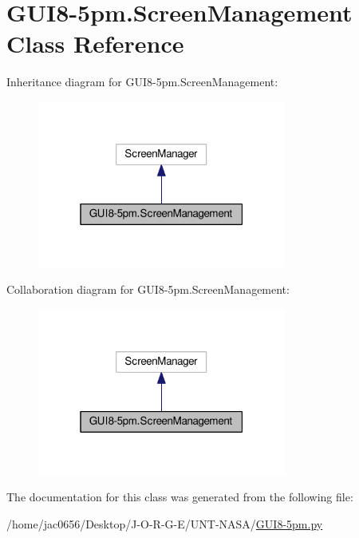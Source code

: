 \hypertarget{classGUI8-5pm_1_1ScreenManagement}{}\section{G\+U\+I8-\/5pm.Screen\+Management Class Reference}
\label{classGUI8-5pm_1_1ScreenManagement}


Inheritance diagram for G\+U\+I8-\/5pm.Screen\+Management\+:\nopagebreak
\begin{figure}[H]
\begin{center}
\leavevmode
\includegraphics[width=232pt]{classGUI8-5pm_1_1ScreenManagement__inherit__graph}
\end{center}
\end{figure}


Collaboration diagram for G\+U\+I8-\/5pm.Screen\+Management\+:\nopagebreak
\begin{figure}[H]
\begin{center}
\leavevmode
\includegraphics[width=232pt]{classGUI8-5pm_1_1ScreenManagement__coll__graph}
\end{center}
\end{figure}


The documentation for this class was generated from the following file\+:\begin{DoxyCompactItemize}
\item 
/home/jac0656/\+Desktop/\+J-\/\+O-\/\+R-\/\+G-\/\+E/\+U\+N\+T-\/\+N\+A\+S\+A/\hyperlink{GUI8-5pm_8py}{G\+U\+I8-\/5pm.\+py}\end{DoxyCompactItemize}
